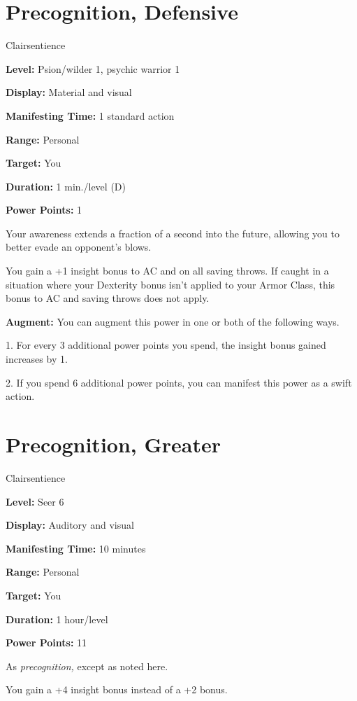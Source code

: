 \documentclass{article}
\begin{document}
\vspace{12pt}
\section*{Precognition, Defensive}

Clairsentience

\textbf{Level:} Psion/wilder 1, psychic warrior 1

\textbf{Display:} Material and visual

\textbf{Manifesting Time:} 1 standard action

\textbf{Range:} Personal

\textbf{Target:} You

\textbf{Duration:} 1 min./level (D)

\textbf{Power Points:} 1

Your awareness extends a fraction of a second into the future, allowing you to 
better evade an opponent's blows.

You gain a +1 insight bonus to AC and on all saving throws. If caught in a situation 
where your Dexterity bonus isn't applied to your Armor Class, this bonus to AC 
and saving throws does not apply.

\textbf{Augment:} You can augment this power in one or both of the following ways.

1. For every 3 additional power points you spend, the insight bonus gained increases 
by 1.

2. If you spend 6 additional power points, you can manifest this power as a swift 
action.

\vspace{12pt}
\section*{Precognition, Greater}

Clairsentience

\textbf{Level:} Seer 6

\textbf{Display:} Auditory and visual

\textbf{Manifesting Time:} 10 minutes

\textbf{Range:} Personal

\textbf{Target:} You

\textbf{Duration:} 1 hour/level

\textbf{Power Points:} 11

As \textit{precognition, }except as noted here. 

You gain a +4 insight bonus instead of a +2 bonus.
\end{document}
